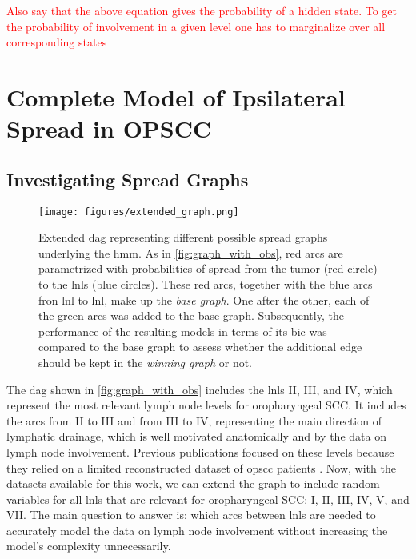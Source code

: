 \documentclass[twocolumn]{aastex631}
\newcommand{\ju}[1]{{\textcolor{red}{#1}}}
\begin{document}
\ju{Also say that the above equation gives the probability of a hidden state. To get the probability of involvement in a given level one has to marginalize over all corresponding states}

\section{Complete Model of Ipsilateral Spread in OPSCC}
\label{sec:complete_model}


\subsection{Investigating Spread Graphs}
\label{subsec:complete_model:graphs}

\begin{figure}
    \centering
    \texttt{[image: figures/extended\_graph.png]}
    \caption{Extended \gls{dag} representing different possible spread graphs underlying the \gls{hmm}. As in \cref{fig:graph_with_obs}, red arcs are parametrized with probabilities of spread from the tumor (red circle) to the \glspl{lnl} (blue circles). These red arcs, together with the blue arcs fron \gls{lnl} to \gls{lnl}, make up the \emph{base graph}. One after the other, each of the green arcs was added to the base graph. Subsequently, the performance of the resulting models in terms of its \gls{bic} was compared to the base graph to assess whether the additional edge should be kept in the \emph{winning graph} or not.}
    \label{fig:extended_graph}
\end{figure}

The \gls{dag} shown in \cref{fig:graph_with_obs} includes the \glspl{lnl} II, III, and IV, which represent the most relevant lymph node levels for oropharyngeal SCC. It includes the arcs from II to III and from III to IV, representing the main direction of lymphatic drainage, which is well motivated anatomically and by the data on lymph node involvement. Previous publications  \cite{pouymayou_bayesian_2019,ludwig_hidden_2021} focused on these levels because they relied on a limited reconstructed dataset of \gls{opscc} patients \cite{sanguineti_defining_2009}. Now, with the datasets available for this work, we can extend the graph to include random variables for all \glspl{lnl} that are relevant for oropharyngeal SCC: I, II, III, IV, V, and VII. The main question to answer is: which arcs between \glspl{lnl} are needed to accurately model the data on lymph node involvement without increasing the model's complexity unnecessarily.
\end{document}
